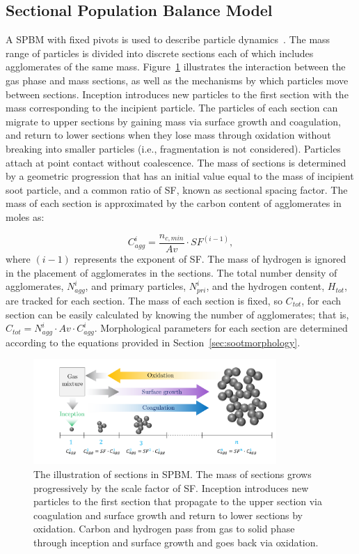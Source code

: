 \subsection{Sectional Population Balance Model}
A SPBM with fixed pivots is used to describe particle dynamics~\citep{wu1988discrete}. The mass range of particles is divided into discrete sections each of which includes agglomerates of the same mass. Figure~\ref{fig:sectional} illustrates the interaction between the gas phase and mass sections, as well as the mechanisms by which particles move between sections. Inception introduces new particles to the first section with the mass corresponding to the incipient particle. The particles of each section can migrate to upper sections by gaining mass via surface growth and coagulation, and return to lower sections when they lose mass through oxidation without breaking into smaller particles (i.e., fragmentation is not considered). Particles attach at point contact without coalescence. The mass of sections is determined by a geometric progression that has an initial value equal to the mass of incipient soot particle, and a common ratio of SF, known as sectional spacing factor. The mass of each section is approximated by the carbon content of agglomerates in moles as:

\begin{equation}
	C^i_{agg} = \frac{n_{c,min}}{Av}\cdot SF^{(i-1)},
	\label{eqn:Caggsec}
\end{equation}
\noindent where $(i-1)$ represents the exponent of SF. The mass of hydrogen is ignored in the placement of agglomerates in the sections.
The total number density of agglomerates, $N^i_{agg}$, and primary particles, ${N^i_{pri}}$, and the hydrogen content, $H_{tot}$, are tracked for each section. The mass of each section is fixed, so $C_{tot}$, for each section can be easily calculated by knowing the number of agglomerates; that is, $C_{tot} = N^i_{agg} \cdot {Av} \cdot C^i_{agg}$. Morphological parameters for each section are determined according to the equations provided in Section~\ref{sec:sootmorphology}.


\begin{figure}[!htbp]
	\centering
	\includegraphics[height=40mm, ]{Figures/Theory/Sectional.pdf}
	\caption{The illustration of sections in SPBM. The mass of sections grows progressively by the scale factor of SF. Inception introduces new particles to the first section that propagate to the upper section via coagulation and surface growth and return to lower sections by oxidation. Carbon and hydrogen pass from gas to solid phase through inception and surface growth and goes back via oxidation.}
	\label{fig:sectional}
\end{figure}
 
